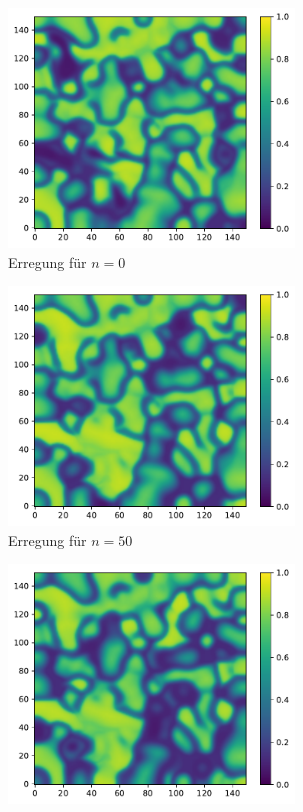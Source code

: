 \begin{appendices}
\begin{figure}[h]
	\centering
	\begin{subfigure}{.5\textwidth}
		\centering
		\includegraphics[height=2.5in]{figures/results/dynamics/mitchell_0.pdf}
		\setcapmargin[1cm]{0.5cm}
		\caption{Erregung für $n=0$}
	\end{subfigure}%
	\begin{subfigure}{.5\textwidth}
		\centering
		\includegraphics[height=2.5in]{figures/results/dynamics/mitchell_50.pdf}
		\setcapmargin[1cm]{0.5cm}
		\caption{Erregung für $n=50$}
	\end{subfigure}
	\begin{subfigure}{.5\textwidth}
		\centering
		\includegraphics[height=2.5in]{figures/results/dynamics/mitchell_100.pdf}

\end{subfigure}
\end{figure}
\end{appendices}

